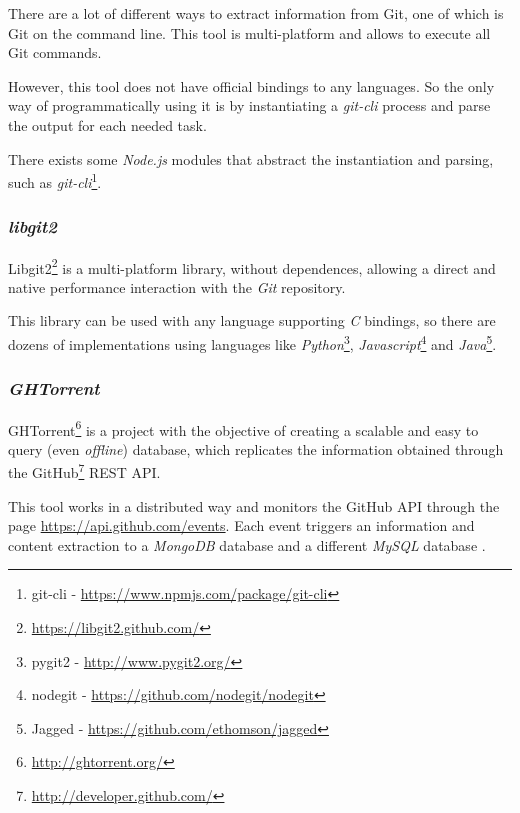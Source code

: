There are a lot of different ways to extract information from Git, one of which is Git on the command line. This tool is multi-platform and allows to execute all Git commands.

However, this tool does not have official bindings to any languages. So the only way of programmatically using it is by instantiating a \emph{git-cli} process and parse the output for each needed task.

There exists some \emph{Node.js} modules that abstract the instantiation and parsing, such as \emph{git-cli}\footnote{git-cli - \url{https://www.npmjs.com/package/git-cli}}.

\subsubsection{\emph{libgit2}}

Libgit2\footnote{\url{https://libgit2.github.com/}} is a multi-platform library, without dependences, allowing a direct and native performance interaction with the \emph{Git} repository.

This library can be used with any language supporting \emph{C} bindings, so there are dozens of implementations using languages like \emph{Python}\footnote{pygit2 - \url{http://www.pygit2.org/}}, \emph{Javascript}\footnote{nodegit - \url{https://github.com/nodegit/nodegit}} and \emph{Java}\footnote{Jagged - \url{https://github.com/ethomson/jagged}}.

\subsubsection{\emph{GHTorrent}}

GHTorrent\footnote{\url{http://ghtorrent.org/}} is a project with the objective of creating a scalable and easy to query (even \emph{offline}) database, which replicates the information obtained through the GitHub\footnote{\url{http://developer.github.com/}} REST API.

This tool works in a distributed way and monitors the GitHub API through the page \url{https://api.github.com/events}. Each event triggers an information and content extraction to a \emph{MongoDB} database and a different \emph{MySQL} database \cite{Gousios2012}.
